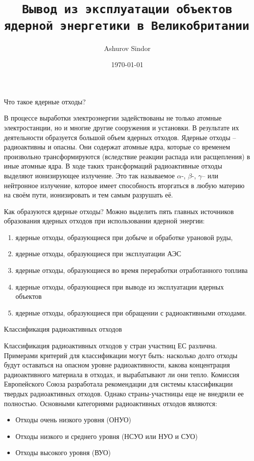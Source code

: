 \documentclass{beamer}
\author{Ashurov Sindor}
\title{\texttt{Вывод из эксплуатации объектов ядерной энергетики в Великобритании
}}
\date{\today}
\begin{document}
\begin{frame}
  \titlepage
\end{frame}

\begin{frame}{Что такое ядерные отходы?}

В процессе выработки электроэнергии задействованы не только атомные  электростанции, но и многие другие сооружения и установки. В результате их деятельности образуется большой объем ядерных отходов. Ядерные отходы – радиоактивны и опасны. Они содержат атомные ядра, которые со временем произвольно трансформируются (вследствие реакции распада или расщепления) в иные атомные ядра. В ходе таких трансформаций радиоактивные отходы выделяют ионизирующее излучение. Это так называемое $\alpha$-, $\beta$-, $\gamma$– или нейтронное излучение, которое имеет способность вторгаться в любую материю на своём пути, ионизировать и тем самым разрушать её.

\end{frame}


\begin{frame}{Как образуются ядерные отходы?}
    Можно выделить пять главных источников образования ядерных отходов при использовании ядерной энергии:
    \begin{enumerate}
        \item  ядерные отходы, образующиеся при добыче и обработке урановой руды,
\item ядерные отходы, образующиеся при эксплуатации АЭС
\item ядерные отходы, образующиеся во время переработки отработанного топлива
\item  ядерные отходы, образующиеся при выводе из эксплуатации ядерных объектов
\item ядерные отходы, образующиеся при обращении с радиоактивными отходами.
   \end{enumerate}
\end{frame}

\begin{frame}{Классификация радиоактивных отходов}

Классификация радиоактивных отходов у стран участниц ЕС различна. Примерами критерий для классификации могут быть: насколько долго отходы будут оставаться на опасном уровне радиоактивности, какова концентрация радиоактивного материала в отходах, и вырабатывают ли они тепло. Комиссия Европейского Союза разработала рекомендации для системы классификации твердых радиоактивных отходов. Однако страны-участницы еще не внедрили ее полностью. Основными категориями радиоактивных отходов являются:
\begin{itemize}
\item Отходы очень низкого уровня (ОНУО)
\item Отходы низкого и среднего уровня (НСУО или НУО и СУО)
\item Отходы высокого уровня (ВУО)
\end{itemize}

\end{frame}
\end{document}

